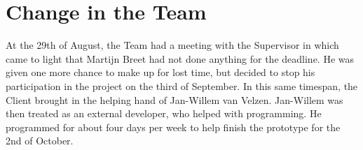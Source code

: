 \section{Change in the Team}
\thispagestyle{fancy}
\label{sec:teamchange}
At the 29th of August, the Team had a meeting with the Supervisor in which came to light that Martijn Breet had not done anything for the deadline. He was given one more chance to make up for lost time, but decided to stop his participation in the project on the third of September. In this same timespan, the Client brought in the helping hand of Jan-Willem van Velzen. Jan-Willem was then treated as an external developer, who helped with programming. He programmed for about four days per week to help finish the prototype for the 2nd of October. 